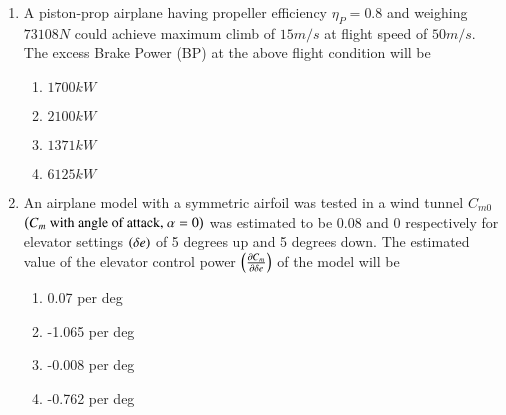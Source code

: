 \documentclass[journal]{IEEEtran}
\begin{document}
\begin{enumerate}
    \item A piston-prop airplane having propeller efficiency $\eta_P = 0.8$ and weighing $73108 N$
    could achieve maximum climb of $15 m/s$ at flight speed of $50 m/s$. The excess Brake Power (BP)
    at the above flight condition will be

    \begin{multicols}{4}
        \begin{enumerate}
            \item $1700 kW$
            \item $2100 kW$
            \item $1371 kW$
            \item $6125 kW$
        \end{enumerate}
    \end{multicols}

\item An airplane model with a symmetric airfoil was tested in a wind tunnel $C_{m0}$ $\left(C_m\text{ with
    angle of attack, }\alpha = 0\right)$ was estimated to be $0.08$ and $0$ respectively for elevator settings
    $\left(\delta e\right)$ of 5 degrees up and 5 degrees down. The estimated value of the elevator control power
    $\left(\frac{\partial C_m}{\partial \delta e}\right)$ of the model will be

    \begin{multicols}{2}
        \begin{enumerate}
            \item 0.07 per deg
            \item -1.065 per deg
            \item -0.008 per deg
            \item -0.762 per deg
        \end{enumerate}
    \end{multicols}

\end{enumerate}
\end{document}
